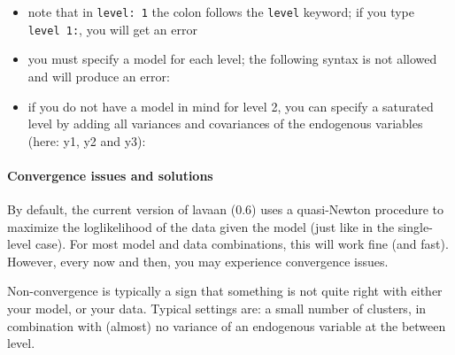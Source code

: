 \begin{itemize}
\item
  note that in \texttt{level:\ 1} the colon follows the \texttt{level}
  keyword; if you type \texttt{level\ 1:}, you will get an error
\item
  you must specify a model for each level; the following syntax is not
  allowed and will produce an error:

\begin{Shaded}
\begin{Highlighting}[]
\end{Highlighting}
\end{Shaded}
\item
  if you do not have a model in mind for level 2, you can specify a
  saturated level by adding all variances and covariances of the
  endogenous variables (here: y1, y2 and y3):

\begin{Shaded}
\begin{Highlighting}[]
\end{Highlighting}
\end{Shaded}
\end{itemize}

\hypertarget{convergence-issues-and-solutions}{%
\paragraph{Convergence issues and
solutions}\label{convergence-issues-and-solutions}}

By default, the current version of lavaan (0.6) uses a quasi-Newton
procedure to maximize the loglikelihood of the data given the model
(just like in the single-level case). For most model and data
combinations, this will work fine (and fast). However, every now and
then, you may experience convergence issues.

Non-convergence is typically a sign that something is not quite right
with either your model, or your data. Typical settings are: a small
number of clusters, in combination with (almost) no variance of an
endogenous variable at the between level.

